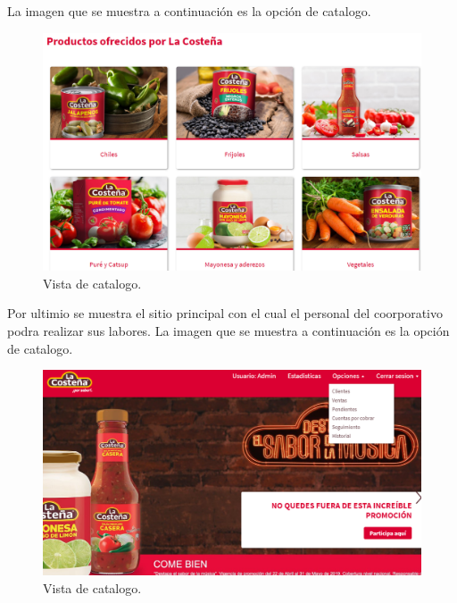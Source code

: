 \documentclass[12pt,letterpaper]{article}
\begin{document}
\newpage
La imagen que se muestra a continuación es la opción de catalogo.
\begin{figure}[ht]
    \centering
    \includegraphics[width=1\textwidth]{imagenes/fron1.png}
    \caption{Vista de catalogo.}
\end{figure}

\newpage
Por ultimio se muestra el sitio principal con el cual el personal del coorporativo podra 
realizar sus labores. 
La imagen que se muestra a continuación es la opción de catalogo.
\begin{figure}[ht]
    \centering
    \includegraphics[width=1\textwidth]{imagenes/fron2.png}
    \caption{Vista de catalogo.}
\end{figure}
\end{document}
